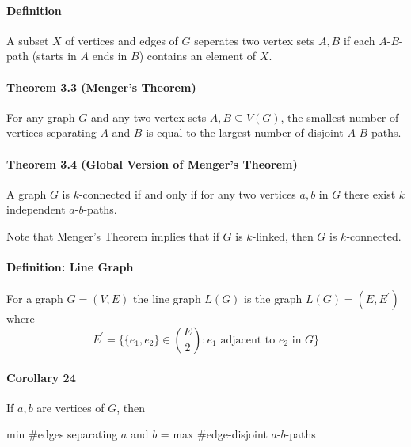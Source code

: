 \paragraph{Definition} A subset $ X $ of vertices and edges of $ G $ seperates
two vertex sets $ A,B $ if each $A$-$B$-path (starts in $ A $ ends in $B$) contains an element of $X$.

\paragraph{Theorem 3.3 (Menger's Theorem)} For any graph $ G $ and any two 
vertex sets $ A,B \subseteq V(G) $, the smallest number of vertices separating 
$ A $ and $ B $ is equal to the largest number of disjoint $A$-$B$-paths.

\paragraph{Theorem 3.4 (Global Version of Menger's Theorem)} A graph $ G $ is 
$k$-connected if and only if for any two vertices $ a,b $ in $ G $ there exist 
$ k $ independent $a$-$b$-paths.

\smallskip \noindent
Note that Menger's Theorem implies that if $ G $ is $k$-linked, then $ G $ 
is $k$-connected.

\paragraph{Definition: Line Graph} For a graph $ G = (V,E) $ the line graph
$L(G)$ is the graph $L(G) = (E,E^\prime) $ where
$$ E^\prime = \{\{e_1,e_2\} \in \binom{E}{2}: e_1 
\text{ adjacent to } e_2 \text{ in } G\} $$

\paragraph{Corollary 24} If $a,b$ are vertices of $ G$, then
\begin{center}
    min \#edges separating $ a $ and $ b $ = max \#edge-disjoint $a$-$b$-paths
\end{center}


